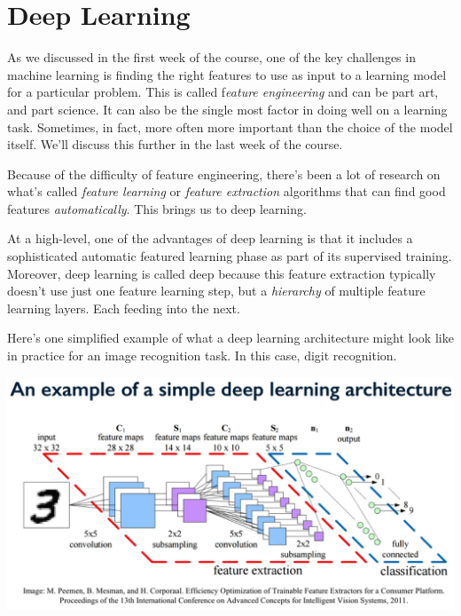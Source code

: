 \section{Deep Learning}
\begin{multicols}{2}

As we discussed in the first week of the course, one of the key challenges in machine learning is finding the right features to use as input to a learning model for a particular problem. This is called f\emph{eature engineering} and can be part art, and part science. It can also be the single most factor in doing well on a learning task. Sometimes, in fact, more often more important than the choice of the model itself. 
We'll discuss this further in the last week of the course. 

Because of the difficulty of feature engineering, there's been a lot of research on what's called \emph{feature learning} or \emph{feature extraction} algorithms that can find good features \emph{automatically}. This brings us to deep learning. 

At a high-level, one of the advantages of deep learning is that it includes a sophisticated automatic featured learning phase as part of its supervised training. Moreover, deep learning is called deep because this feature extraction typically doesn't use just one feature learning step, but a \emph{hierarchy} of multiple feature learning layers. Each feeding into the next.

Here's one simplified example of what a deep learning architecture might look like in practice for an image recognition task. In this case, digit recognition.

\begin{center}
	\includegraphics[width=\linewidth]{img/Deep-Learning-Architecture.png} 
\end{center} 


\end{multicols}
